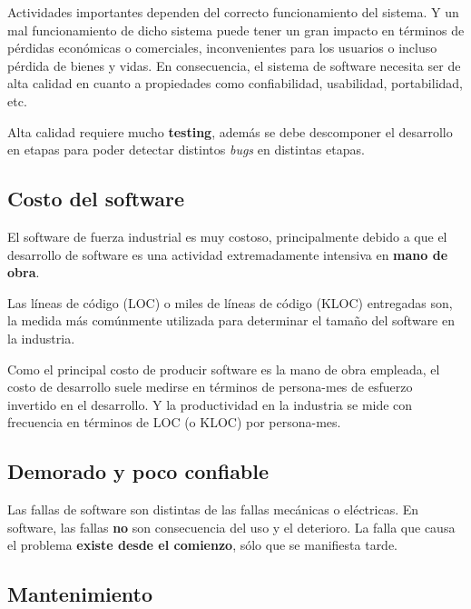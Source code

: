\begin{myobs}{}{}
    Actividades importantes dependen del correcto funcionamiento del sistema. Y un mal funcionamiento de dicho sistema puede tener un gran impacto en términos de pérdidas económicas o comerciales, inconvenientes para los usuarios o incluso pérdida de bienes y vidas. En consecuencia, el sistema de software necesita ser de alta calidad en cuanto a propiedades como confiabilidad, usabilidad, portabilidad, etc.
\end{myobs}

Alta calidad requiere mucho \textbf{testing}, además se debe descomponer el desarrollo en etapas para poder detectar distintos \textit{bugs} en distintas etapas.

\subsection{Costo del software}

El software de fuerza industrial es muy costoso, principalmente debido a que el desarrollo de software es una actividad extremadamente intensiva en \textbf{mano de obra}.

\begin{myobs}{}{}
    Las líneas de código (LOC) o miles de líneas de código (KLOC) entregadas son, la medida más comúnmente utilizada para determinar el tamaño del software en la industria.
\end{myobs}

Como el principal costo de producir software es la mano de obra empleada, el costo de desarrollo suele medirse en términos de persona-mes de esfuerzo invertido en el desarrollo. Y la productividad en la industria se mide con frecuencia en términos de LOC (o KLOC) por persona-mes.

\subsection{Demorado y poco confiable}

Las fallas de software son distintas de las fallas mecánicas o eléctricas. En software, las fallas \textbf{no} son consecuencia del uso y el deterioro. La falla que causa el problema \textbf{existe desde el comienzo}, sólo que se manifiesta tarde.

\subsection{Mantenimiento}

